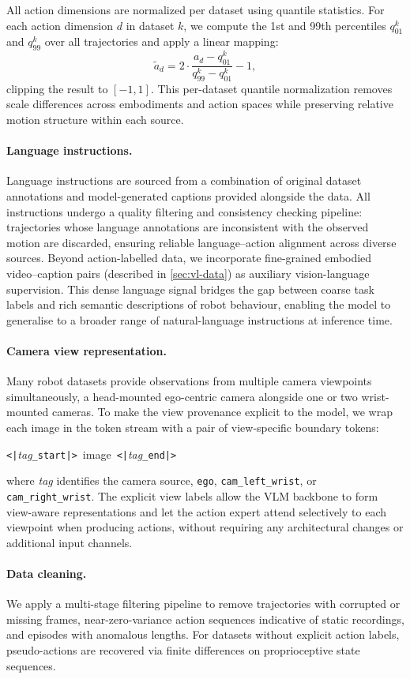 All action dimensions are normalized per dataset using quantile statistics.
For each action dimension $d$ in dataset $k$, we compute the 1st and 99th
percentiles $q^k_{01}$ and $q^k_{99}$ over all trajectories and apply a
linear mapping:
\begin{equation}
    \tilde{a}_d = 2 \cdot \frac{a_d - q^k_{01}}{q^k_{99} - q^k_{01}} - 1,
\end{equation}
clipping the result to $[-1, 1]$. This per-dataset quantile normalization
removes scale differences across embodiments and action spaces while preserving
relative motion structure within each source.

\paragraph{Language instructions.}
Language instructions are sourced from a combination of original dataset
annotations and model-generated captions provided alongside the data.
All instructions undergo a quality filtering and consistency checking pipeline:
trajectories whose language annotations are inconsistent with the observed
motion are discarded, ensuring reliable language--action alignment across
diverse sources.
Beyond action-labelled data, we incorporate fine-grained embodied video--caption
pairs (described in \cref{sec:vl-data}) as auxiliary vision-language supervision.
This dense language signal bridges the gap between coarse task labels and rich
semantic descriptions of robot behaviour, enabling the model to generalise to a
broader range of natural-language instructions at inference time.

\paragraph{Camera view representation.}
Many robot datasets provide observations from multiple camera viewpoints
simultaneously, \eg a head-mounted ego-centric camera alongside one or two
wrist-mounted cameras.
To make the view provenance explicit to the model, we wrap each image in the
token stream with a pair of view-specific boundary tokens:
\begin{center}
\texttt{<|}\textit{tag}\texttt{\_start|>}\ \textlangle image\textrangle\ \texttt{<|}\textit{tag}\texttt{\_end|>}
\end{center}
where \textit{tag} identifies the camera source, \eg \texttt{ego},
\texttt{cam\_left\_wrist}, or \texttt{cam\_right\_wrist}.
The explicit view labels allow the VLM backbone to form view-aware
representations and let the action expert attend selectively to each
viewpoint when producing actions, without requiring any architectural
changes or additional input channels.

\paragraph{Data cleaning.}
We apply a multi-stage filtering pipeline to remove trajectories with corrupted
or missing frames, near-zero-variance action sequences indicative of static
recordings, and episodes with anomalous lengths. For datasets without explicit
action labels, pseudo-actions are recovered via finite differences on
proprioceptive state sequences.
